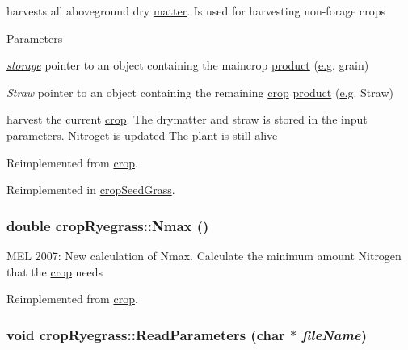 harvests all aboveground dry \hyperlink{classmatter}{matter}. Is used for harvesting non-\/forage crops 
\begin{DoxyParams}{Parameters}
\item[{\em \hyperlink{classstorage}{storage}}]pointer to an object containing the maincrop \hyperlink{classproduct}{product} (\hyperlink{typer_8h_ae4c405e5c68c6ec2c44bb6d6adfc2f6ca35c0bb7088830963c73dcf0470ab8922}{e.g}. grain) \item[{\em Straw}]pointer to an object containing the remaining \hyperlink{classcrop}{crop} \hyperlink{classproduct}{product} (\hyperlink{typer_8h_ae4c405e5c68c6ec2c44bb6d6adfc2f6ca35c0bb7088830963c73dcf0470ab8922}{e.g}. Straw)\end{DoxyParams}
harvest the current \hyperlink{classcrop}{crop}. The drymatter and straw is stored in the input parameters. Nitroget is updated The plant is still alive 

Reimplemented from \hyperlink{classcrop_a387dc393ee7cd05a40874739cff8579e}{crop}.

Reimplemented in \hyperlink{classcrop_seed_grass_a3415f1b4d08da621709cbb07156137e0}{cropSeedGrass}.\hypertarget{classcrop_ryegrass_aac89498ebd762c28e8bed76ec7c78db0}{
\subsubsection[{Nmax}]{\setlength{\rightskip}{0pt plus 5cm}double cropRyegrass::Nmax ()}}
\label{classcrop_ryegrass_aac89498ebd762c28e8bed76ec7c78db0}
MEL 2007: New calculation of Nmax. Calculate the minimum amount Nitrogen that the \hyperlink{classcrop}{crop} needs 

Reimplemented from \hyperlink{classcrop_a6416f0baf1364f2cf28f312584c39f73}{crop}.\hypertarget{classcrop_ryegrass_a0bcd3f5b23b82810d40e2bf089755447}{
\subsubsection[{ReadParameters}]{\setlength{\rightskip}{0pt plus 5cm}void cropRyegrass::ReadParameters (char $\ast$ {\em fileName})}}
\label{classcrop_ryegrass_a0bcd3f5b23b82810d40e2bf089755447}


